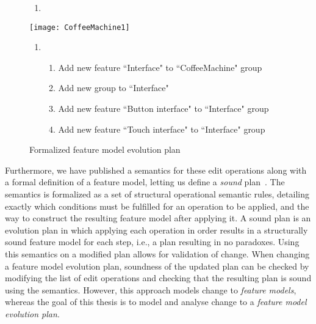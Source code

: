 \begin{figure}
   \footnotesize
   \begin{center}
      \begin{minipage}{0.98\textwidth}
         \begin{enumerate}[{\small $t_0$}]
            \item 
         \end{enumerate}
      \end{minipage}
      \texttt{[image: CoffeeMachine1]}
      \bigskip

      \begin{minipage}{0.98\textwidth}
         \begin{enumerate}[{\small $t_1$}]
            \item 
               \begin{enumerate}[ ]
                  \item Add new \mandatory{} feature ``Interface" to ``CoffeeMachine" \andtype{} group
                  \item Add new \xortype{} group to ``Interface"
                  \item Add new feature ``Button interface" to ``Interface" \xortype{} group
                  \item Add new feature ``Touch interface"  to ``Interface" \xortype{} group               \end{enumerate}
         \end{enumerate}
      \end{minipage}
      \caption{Formalized feature model evolution plan}
      \label{ex:formal-evolution-plan}
   \end{center}
\end{figure}

Furthermore, we have published a semantics for these edit operations along with a formal definition of a feature model, letting us define a \emph{sound} plan~\cite{art:consistency-preserving-evolution-planning}. The semantics is formalized as a set of structural operational semantic rules, detailing exactly which conditions must be fulfilled for an operation to be applied, and the way to construct the resulting feature model after applying it. A sound plan is an evolution plan in which applying each operation in order results in a structurally sound feature model for each step, i.e., a plan resulting in no paradoxes. Using this semantics on a modified plan allows for validation of change. When changing a feature model evolution plan, soundness of the updated plan can be checked by modifying the list of edit operations and checking that the resulting plan is sound using the semantics. However, this approach models change to \emph{feature models}, whereas the goal of this thesis is to model and analyse change to a \emph{feature model evolution plan}. 

